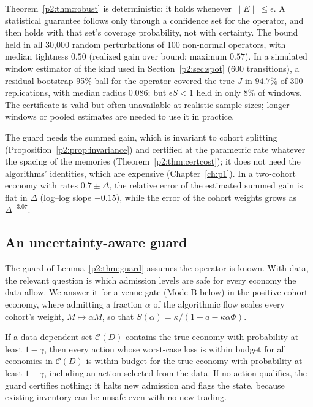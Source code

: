 Theorem~\ref{p2:thm:robust} is deterministic: it holds whenever $\|E\|\le\epsilon$. A statistical guarantee follows only through a confidence set for the operator, and then holds with that set's coverage probability, not with certainty. The bound held in all 30,000 random perturbations of 100 non-normal operators, with median tightness $0.50$ (realized gain over bound; maximum $0.57$). In a simulated window estimator of the kind used in Section~\ref{p2:sec:spot} (600 transitions), a residual-bootstrap 95\% ball for the operator covered the true $J$ in $94.7\%$ of 300 replications, with median radius $0.086$; but $\epsilon S<1$ held in only $8\%$ of windows. The certificate is valid but often unavailable at realistic sample sizes; longer windows or pooled estimates are needed to use it in practice.

The guard needs the summed gain, which is invariant to cohort splitting (Proposition~\ref{p2:prop:invariance}) and certified at the parametric rate whatever the spacing of the memories (Theorem~\ref{p2:thm:certcost}); it does not need the algorithms' identities, which are expensive (Chapter~\ref{ch:p1}). In a two-cohort economy with rates $0.7\pm\Delta$, the relative error of the estimated summed gain is flat in $\Delta$ (log--log slope $-0.15$), while the error of the cohort weights grows as $\Delta^{-3.07}$.


\subsection{An uncertainty-aware guard}\label{p2:sec:robustguard}
The guard of Lemma~\ref{p2:thm:guard} assumes the operator is known. With data, the relevant question is which admission levels are safe for every economy the data allow. We answer it for a venue gate (Mode B below) in the positive cohort economy, where admitting a fraction $\alpha$ of the algorithmic flow scales every cohort's weight, $M\mapsto\alpha M$, so that $S(\alpha)=\kappa/(1-a-\kappa\alpha\Phi)$.

\begin{lemma}\label{p2:lem:sound}
If a data-dependent set $\mathcal C(D)$ contains the true economy with probability at least $1-\gamma$, then every action whose worst-case loss is within budget for all economies in $\mathcal C(D)$ is within budget for the true economy with probability at least $1-\gamma$, including an action selected from the data. If no action qualifies, the guard certifies nothing: it halts new admission and flags the state, because existing inventory can be unsafe even with no new trading.
\end{lemma}

